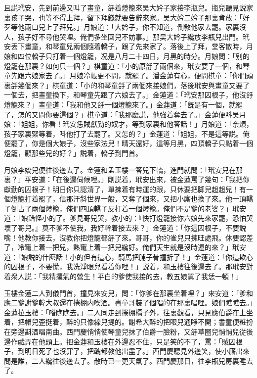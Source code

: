 且説玳安，先到前邊又叫了畫童，㧱着燈籠來吴大妗子家接李瓶兒。瓶兒聽見説家裏孩子哭，也等不得上拜，留下拜錢就要告辭來家。吴大妗二妗子那裏肯放：「好歹等他兩口兒上了拜兒。」月娘道：「大妗子，你不知道，倒敎他家去罷。家裏沒人，孩子好不尋他哭哩。俺們多坐回兒不妨事。」那吴大妗子纔放李瓶兒出門。玳安丢下畫童，和琴童兒兩個隨着轎子，跟了先來家了。落後上了拜，堂客散時，月娘和四位轎子只打着一個燈籠，况是八月二十四日，月黑的時分。月娘問：「别的燈籠在那裏？如何只一個？」棋童道：「小的原㧱了兩個來，玳安要了一個，和琴童先跟六娘家去了。」月娘冷帳更不問，就罷了。潘金蓮有心，便問棋童：「你們頭裏㧱幾個來？」棋童道：「小的和琴童㧱了兩個來接娘們，落後玳安與畫童又要了一個去，把畫童換下，和琴童先跟了六娘去了。」金蓮道：「玳安那囚根子，他沒㧱燈籠來？」畫童道：「我和他又㧱一個燈籠來了。」金蓮道：「旣是有一個，就罷了，怎的又問你要這個？」棋童道：「我那麽説，他強着奪去了。」金蓮便呌吴月娘：「姐姐，你看！玳安恁賊獻勤的奴才，等到家裏和他答話！」月娘道：「奈煩，孩子家裏緊等着，呌他打了去罷了。又怎的？」金蓮道：「姐姐，不是這等説。俺便罷了，你是個大娘子，沒些家法兒！晴天還好，這等月黑，四頂轎子只點着一個燈籠，顧那些兒的好？」説着，轎子到門首。

月娘李嬌兒便往後邊去了。金蓮和孟玉樓一答兒下轎，進門就問：「玳安兒在那裏？」平安道：「在後邊伺候哩。」剛説着，玳安出來，被金蓮罵了幾句：「我把你獻勤的囚根子！明日你只認清了，單揀着有時運的跟，只休要把脚兒趄趄兒！有一個燈籠打着罷了，信那汗斜世界一般，又奪了個來，又把小廝也換了來。他一頂轎子倒占了兩個燈籠，俺們四頂轎子反打着一個燈籠。俺們不是爹的老婆？」玳安道：「娘錯怪小的了。爹見哥兒哭，教小的：『快打燈籠接你六娘先來家罷，恐怕哭壞了哥兒。』莫不爹不使我，我好幹着接去來？」金蓮道：「你這囚根子，不要説嘴！他教你接去，沒教你把燈籠都㧱了來。哥哥，你的雀兒只揀旺處飛。休要認差了，冷竃上着一把兒，熱竃上着一把兒纔好。俺們天生就是沒時運的來？」玳安道：「娘説的什麽話！小的但有這心，騎馬把脯子骨撞折了！」金蓮道：「你這欺心的囚根子，不要慌，我洗淨眼兒看着你哩！」説着，和玉樓往後邊去了。那玳安對着衆人説：「我精攮氣的營生！平白的爹使我接的去，教五娘駡了我恁一頓！」

玉樓金蓮二人到儀門首，撞見來安兒，問：「你爹在那裏坐着哩？」來安道：「爹和應二爹謝爹韓大叔還在捲棚内喫酒。書童哥裝了個唱的在那裏唱哩。娘們瞧瞧去。」金蓮拉玉樓：「喒瞧瞧去。」二人同走到捲棚槅子外，往裏觀看，只見應伯爵在上坐着，把帽兒歪挺着，醉的只像線兒提的。謝希大醉的把眼兒通睜不開；書童便粧扮在旁邊斟酒唱南曲。西門慶悄悄使琴童兒抹了伯爵一臉粉，又㧱草圈兒悄悄兒従後邊作戲弄在他頭上。把金蓮和玉樓在外邊忍不住，只是笑的不了，罵：「賊囚根子，到明日死了也沒罪了，把醜都教他出盡了。」西門慶聽見外邊笑，使小廝出來問是誰，二人纔往後邊去了。散時已一更天氣了。西門慶那日，往李瓶兒房裏睡去了。

